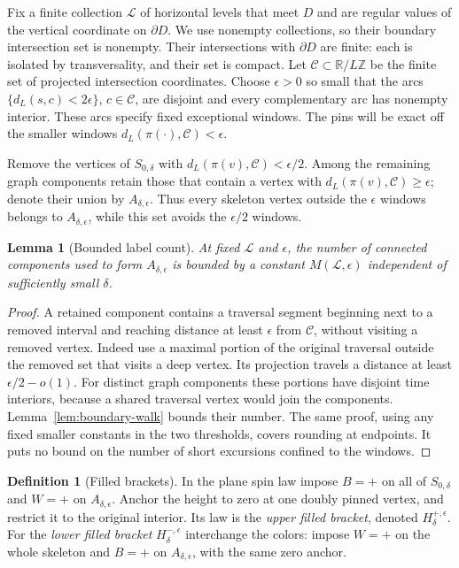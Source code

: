 \documentclass[11pt]{article}
\newcommand{\R}{\mathbb R}
\newcommand{\Z}{\mathbb Z}
\newtheorem{lemma}[theorem]{Lemma}
\theoremstyle{definition}
\newtheorem{definition}[theorem]{Definition}
\theoremstyle{remark}
\numberwithin{equation}{section}
\begin{document}
Fix a finite collection $\mathcal L$ of horizontal levels that meet
$D$ and are regular values of the vertical coordinate on $\partial D$.
We use nonempty collections, so their boundary intersection set is
nonempty.  Their
intersections with $\partial D$ are finite: each is isolated by
transversality, and their set is compact.  Let $\mathcal C\subset\R/L\Z$
be the finite set of projected intersection coordinates.  Choose
$\epsilon>0$ so small that the arcs
$\{d_L(s,c)<2\epsilon\}$, $c\in\mathcal C$, are disjoint and every
complementary arc has nonempty interior.  These arcs specify fixed
exceptional windows.  The pins will be exact off the smaller windows
$d_L(\pi(\cdot),\mathcal C)<\epsilon$.

Remove the vertices of $S_{0,\delta}$ with
$d_L(\pi(v),\mathcal C)<\epsilon/2$.  Among the remaining graph
components retain those that contain a vertex with
$d_L(\pi(v),\mathcal C)\ge\epsilon$; denote their union by
$A_{\delta,\epsilon}$.  Thus every skeleton vertex outside the
$\epsilon$ windows belongs to $A_{\delta,\epsilon}$, while this set
avoids the $\epsilon/2$ windows.

\begin{lemma}[Bounded label count]\label{pins:label-count}
At fixed $\mathcal L$ and $\epsilon$, the number of connected
components used to form $A_{\delta,\epsilon}$ is bounded by a constant
$M(\mathcal L,\epsilon)$ independent of sufficiently small $\delta$.
\end{lemma}

\begin{proof}
A retained component contains a traversal segment beginning next to a
removed interval and reaching distance at least $\epsilon$ from
$\mathcal C$, without visiting a removed vertex.  Indeed use a maximal
portion of the original traversal outside the removed set that visits
a deep vertex.  Its projection travels a distance at least
$\epsilon/2-o(1)$.  For distinct graph components these portions have
disjoint time interiors, because a shared traversal vertex would join
the components.  Lemma~\ref{lem:boundary-walk} bounds their number.
The same proof, using any fixed smaller constants in the two thresholds,
covers rounding at endpoints.  It puts no bound on the number of short
excursions confined to the windows.
\end{proof}

\begin{definition}[Filled brackets]\label{def:brackets}
In the plane spin law impose $B=+$ on all of $S_{0,\delta}$ and $W=+$
on $A_{\delta,\epsilon}$.  Anchor the height to zero at one doubly pinned
vertex, and restrict it to the original interior.  Its law is the
\emph{upper filled bracket}, denoted $H_\delta^{+,\epsilon}$.  For the
\emph{lower filled bracket} $H_\delta^{-,\epsilon}$ interchange the
colors: impose $W=+$ on the whole skeleton and $B=+$ on
$A_{\delta,\epsilon}$, with the same zero anchor.
\end{definition}
\end{document}
